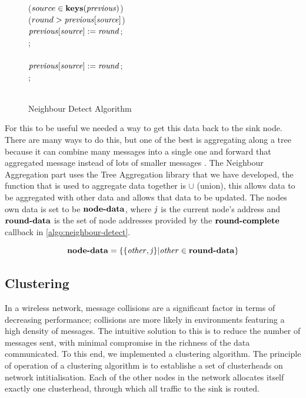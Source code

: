 \begin{figure}[H]
\begin{boxedminipage}{\linewidth}
    \null\qq\qq {} ($source \in \mbox{\textbf{keys}}(\mbox{\emph{previous}})$)  \\
    \null\qq\qq\qq {} ($round > \mbox{\emph{previous}}[\mbox{\emph{source}}]$)  \\
    \null\qq\qq\qq\qq $\mbox{\emph{previous}}[\mbox{\emph{source}}] \mathrel{:=} \mbox{\emph{round}}$; \\
    \null\qq\qq\qq {}; \\
    \null\qq\qq {} \\
    \null\qq\qq\qq $\mbox{\emph{previous}}[\mbox{\emph{source}}] \mathrel{:=} \mbox{\emph{round}}$; \\
    \null\qq\qq {}; \\~\\
  \end{boxedminipage}
  \caption{Neighbour Detect Algorithm}
  \label{algo:neighbour-detect}
\end{figure}

For this to be useful we needed a way to get this data back to the sink node. There are many ways to do this, but one of the best is aggregating along a tree because it can combine many messages into a single one and forward that aggregated message instead of lots of smaller messages \cite{?}. The Neighbour Aggregation part uses the Tree Aggregation library that we have developed, the function that is used to aggregate data together is $\cup$ (union), this allows data to be aggregated with other data and allows that data to be updated. The nodes own data is set to be $\mbox{\textbf{node-data}}$, where $\mbox{\emph{j}}$ is the current node's address and $\mbox{\textbf{round-data}}$ is the set of node addresses provided by the $\mbox{\textbf{round-complete}}$ callback in \autoref{algo:neighbour-detect}.

\begin{equation}
\mbox{\textbf{node-data}} = \{\{\mbox{\emph{other}}, \mbox{\emph{j}}\} | \mbox{\emph{other}} \in \mbox{\textbf{round-data}} \}
\end{equation}


\subsection{Clustering}

In a wireless network, message collisions are a significant factor in terms of decreasing performance; collisions are more likely in environments featuring a high density of messages. The intuitive solution to this is to reduce the number of messages sent, with minimal compromise in the richness of the data communicated. To this end, we implemented a clustering algorithm. The principle of operation of a clustering algorithm is to establishe a set of clusterheads on network intitialisation. Each of the other nodes in the network allocates itself exactly one clusterhead, through which all traffic to the sink is routed.

